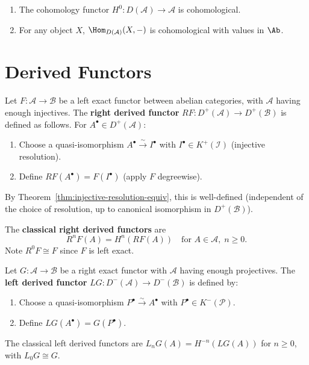 \begin{example}\label{ex:cohomological-functors}
\begin{enumerate}
    \item The cohomology functor $H^0 \colon D(\mathcal{A}) \to \mathcal{A}$ is cohomological.
    \item For any object $X$, $\Hom_{D(\mathcal{A})}(X, -)$ is cohomological with values
    in $\Ab$.
\end{enumerate}
\end{example}


\section{Derived Functors}\label{sec:derived-functors}

\begin{definition}\label{def:right-derived-functor}
Let $F \colon \mathcal{A} \to \mathcal{B}$ be a left exact functor between abelian
categories, with $\mathcal{A}$ having enough injectives. The \textbf{right derived functor}
$RF \colon D^+(\mathcal{A}) \to D^+(\mathcal{B})$ is defined as follows. For
$A^\bullet \in D^+(\mathcal{A})$:
\begin{enumerate}
    \item Choose a quasi-isomorphism $A^\bullet \xrightarrow{\sim} I^\bullet$ with
    $I^\bullet \in K^+(\mathcal{I})$ (injective resolution).
    \item Define $RF(A^\bullet) = F(I^\bullet)$ (apply $F$ degreewise).
\end{enumerate}
By Theorem~\ref{thm:injective-resolution-equiv}, this is well-defined (independent
of the choice of resolution, up to canonical isomorphism in $D^+(\mathcal{B})$).

The \textbf{classical right derived functors} are
\[
    R^n F(A) = H^n(RF(A)) \quad \text{for } A \in \mathcal{A}, \; n \geq 0.
\]
Note $R^0 F \cong F$ since $F$ is left exact.
\end{definition}

\begin{definition}\label{def:left-derived-functor}
Let $G \colon \mathcal{A} \to \mathcal{B}$ be a right exact functor with $\mathcal{A}$
having enough projectives. The \textbf{left derived functor}
$LG \colon D^-(\mathcal{A}) \to D^-(\mathcal{B})$ is defined by:
\begin{enumerate}
    \item Choose a quasi-isomorphism $P^\bullet \xrightarrow{\sim} A^\bullet$ with
    $P^\bullet \in K^-(\mathcal{P})$.
    \item Define $LG(A^\bullet) = G(P^\bullet)$.
\end{enumerate}
The classical left derived functors are $L_n G(A) = H^{-n}(LG(A))$ for $n \geq 0$,
with $L_0 G \cong G$.
\end{definition}

